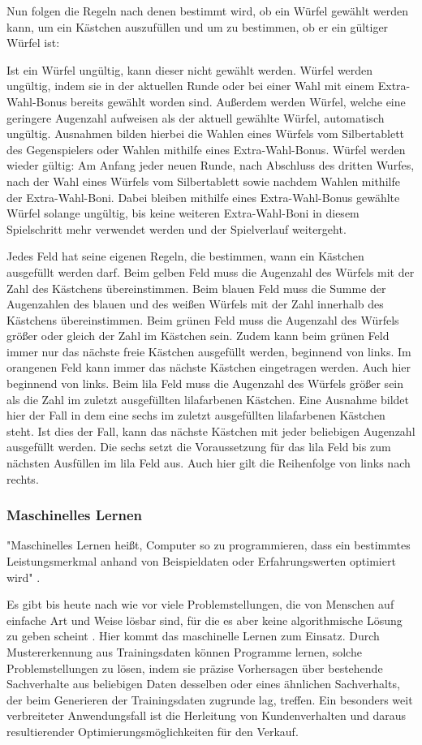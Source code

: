 Nun folgen die Regeln nach denen bestimmt wird, ob ein Würfel gewählt werden kann, um ein Kästchen auszufüllen und um zu bestimmen, ob er ein gültiger Würfel ist:

Ist ein Würfel ungültig, kann dieser nicht gewählt werden. Würfel werden ungültig, indem sie in der aktuellen Runde oder bei einer Wahl mit einem Extra-Wahl-Bonus bereits gewählt worden sind. Außerdem werden Würfel, welche eine geringere Augenzahl aufweisen als der aktuell gewählte Würfel, automatisch ungültig. Ausnahmen bilden hierbei die Wahlen eines Würfels vom Silbertablett des Gegenspielers oder Wahlen mithilfe eines Extra-Wahl-Bonus. Würfel werden wieder gültig: Am Anfang jeder neuen Runde, nach Abschluss des dritten Wurfes, nach der Wahl eines Würfels vom Silbertablett sowie nachdem Wahlen mithilfe der Extra-Wahl-Boni. Dabei bleiben mithilfe eines Extra-Wahl-Bonus gewählte Würfel solange ungültig, bis keine weiteren Extra-Wahl-Boni in diesem Spielschritt mehr verwendet werden und der Spielverlauf weitergeht.

Jedes Feld hat seine eigenen Regeln, die bestimmen, wann ein Kästchen ausgefüllt werden darf. Beim gelben Feld muss die Augenzahl des Würfels mit der Zahl des Kästchens übereinstimmen. Beim blauen Feld muss die Summe der Augenzahlen des blauen und des weißen Würfels mit der Zahl innerhalb des Kästchens übereinstimmen. Beim grünen Feld muss die Augenzahl des Würfels größer oder gleich der Zahl im Kästchen sein. Zudem kann beim grünen Feld immer nur das nächste freie Kästchen ausgefüllt werden, beginnend von links. Im orangenen Feld kann immer das nächste Kästchen eingetragen werden. Auch hier beginnend von links. Beim lila Feld muss die Augenzahl des Würfels größer sein als die Zahl im zuletzt ausgefüllten lilafarbenen Kästchen. Eine Ausnahme bildet hier der Fall in dem eine sechs im zuletzt ausgefüllten lilafarbenen Kästchen steht. Ist dies der Fall, kann das nächste Kästchen mit jeder beliebigen Augenzahl ausgefüllt werden. Die sechs setzt die Voraussetzung für das lila Feld bis zum nächsten Ausfüllen im lila Feld aus. Auch hier gilt die Reihenfolge von links nach rechts.
\subsubsection{Maschinelles Lernen}
"Maschinelles Lernen heißt, Computer so zu programmieren, dass ein bestimmtes Leistungsmerkmal anhand von Beispieldaten oder Erfahrungswerten optimiert wird" \cite[S. 3]{alpaydin_maschinelles_2022}.

Es gibt bis heute nach wie vor viele Problemstellungen, die von Menschen auf einfache Art und Weise lösbar sind, für die es aber keine algorithmische Lösung zu geben scheint \cite[S. 1]{alpaydin_maschinelles_2022}. Hier kommt das maschinelle Lernen zum Einsatz. Durch Mustererkennung aus Trainingsdaten können Programme lernen, solche Problemstellungen zu lösen, indem sie präzise Vorhersagen über bestehende Sachverhalte aus beliebigen Daten desselben oder eines ähnlichen Sachverhalts, der beim Generieren der Trainingsdaten zugrunde lag, treffen. Ein besonders weit verbreiteter Anwendungsfall ist die Herleitung von Kundenverhalten und daraus resultierender Optimierungsmöglichkeiten für den Verkauf. \cite[S. 1f]{alpaydin_maschinelles_2022}

